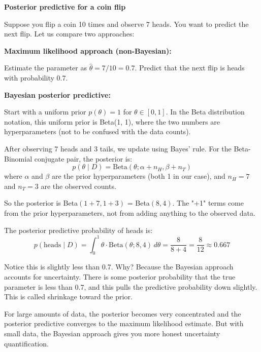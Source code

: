 \vspace{1.5em}

\begin{examplebox}
\textbf{Posterior predictive for a coin flip}

\vspace{0.5em}

Suppose you flip a coin 10 times and observe 7 heads. You want to predict the next flip. Let us compare two approaches:

\vspace{0.5em}

\textbf{Maximum likelihood approach (non-Bayesian):}

Estimate the parameter as $\hat{\theta} = 7/10 = 0.7$. Predict that the next flip is heads with probability 0.7.

\vspace{0.5em}

\textbf{Bayesian posterior predictive:}

Start with a uniform prior $p(\theta) = 1$ for $\theta \in [0, 1]$. In the Beta distribution notation, this uniform prior is Beta(1, 1), where the two numbers are hyperparameters (not to be confused with the data counts).

After observing 7 heads and 3 tails, we update using Bayes' rule. For the Beta-Binomial conjugate pair, the posterior is:
\begin{equation*}
p(\theta \mid D) = \text{Beta}(\theta; \alpha + n_H, \beta + n_T)
\end{equation*}
where $\alpha$ and $\beta$ are the prior hyperparameters (both 1 in our case), and $n_H = 7$ and $n_T = 3$ are the observed counts.

So the posterior is Beta$(1 + 7, 1 + 3)$ = Beta$(8, 4)$. The "+1" terms come from the prior hyperparameters, not from adding anything to the observed data.

The posterior predictive probability of heads is:
\begin{equation*}
p(\text{heads} \mid D) = \int_{0}^{1} \theta \cdot \text{Beta}(\theta; 8, 4) \, d\theta = \frac{8}{8+4} = \frac{8}{12} \approx 0.667
\end{equation*}

Notice this is slightly less than 0.7. Why? Because the Bayesian approach accounts for uncertainty. There is some posterior probability that the true parameter is less than 0.7, and this pulls the predictive probability down slightly. This is called shrinkage toward the prior.

\vspace{0.5em}

For large amounts of data, the posterior becomes very concentrated and the posterior predictive converges to the maximum likelihood estimate. But with small data, the Bayesian approach gives you more honest uncertainty quantification.
\end{examplebox}

